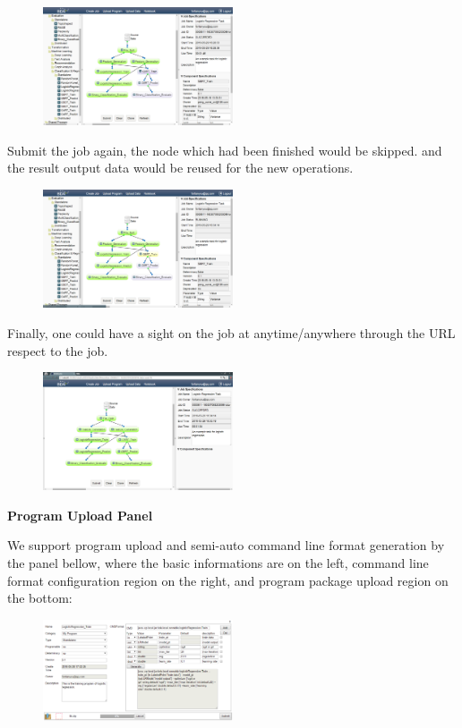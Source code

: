 \documentclass{sig-alternate-05-2015}
\begin{document}
\begin{figure}[!htb]
\centering
\includegraphics[width = 0.5\textwidth]{job_reuse.eps}
\end{figure}

Submit the job again, the node which had been finished would be skipped. and the result output data would be reused for the new operations.

\begin{figure}[!htb]
\centering
\includegraphics[width = 0.5\textwidth]{job_reuse_submit.eps}
\end{figure}

Finally, one could have a sight on the job at anytime/anywhere through the URL respect to the job.
\begin{figure}[!htb]
\centering
\includegraphics[width = 0.5\textwidth]{job_view.eps}
\end{figure}



\noindent\textbf{Program Upload Panel}

We support program upload and semi-auto command line format generation by the panel bellow, where the basic informations are on the left, command line format configuration region on the right, and program package upload region on the bottom:

\begin{figure}[!htb]
\centering
\includegraphics[width = 0.5\textwidth]{Upload_Program.eps}
\end{figure}
\end{document}
